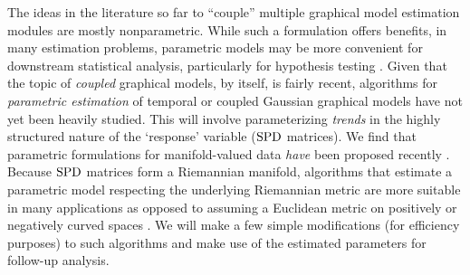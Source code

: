 The ideas in the literature so far to ``couple'' multiple graphical model estimation modules are mostly nonparametric. 
While such a formulation offers benefits, in many estimation problems, 
parametric models may 
be more convenient for downstream statistical analysis,
particularly for hypothesis testing \cite{hardle1993comparing,geer2000empirical,roehrig1988conditions}.
Given that the topic of \textit{coupled} graphical models, by itself, is fairly recent, algorithms for {\em parametric estimation} of 
temporal or coupled Gaussian graphical models have not yet been heavily studied. 
This will involve parameterizing {\em trends} in the highly structured nature of the `response' variable ($\text{SPD}$ matrices). 
We find that parametric formulations for manifold-valued data {\em have} been proposed recently \cite{hjkimcvpr2014,cornea2016regression}. %
Because $\text{SPD}$ matrices form a Riemannian manifold, algorithms
that estimate a parametric model respecting the underlying Riemannian metric are more suitable in many applications as opposed to assuming a Euclidean metric 
on positively or negatively curved spaces \cite{xie2010statistical, fletcher2007riemannian, jayasumanakernel}. We will make a few simple modifications 
(for efficiency purposes) to such algorithms and make use of the estimated parameters for follow-up analysis.


